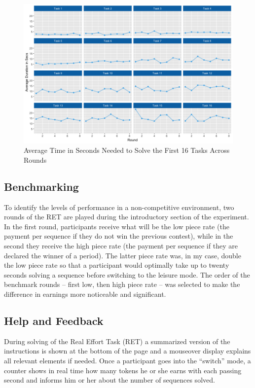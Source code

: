     \begin{figure}[h]
        \centering
        \includegraphics[width = \textwidth]{graphs/avg_time_per_task_round.png}
        \caption{Average Time in Seconds Needed to Solve the First 16 Tasks Across Rounds}
        \label{fig:avg_time_task}
    \end{figure}
    
    
    \subsection{Benchmarking}
    \label{ss:benchmarking}
    
    To identify the levels of performance in a non-competitive environment, two rounds of the RET are played during the introductory section of the experiment. In the first round, participants receive what will be the low piece rate (the payment per sequence if they do not win the previous contest), while in the second they receive the high piece rate (the payment per sequence if they are declared the winner of a period). The latter piece rate was, in my case, double the low piece rate so that a participant would optimally take up to twenty seconds solving a sequence before switching to the leisure mode. The order of the benchmark rounds -- first low, then high piece rate -- was selected to make the difference in earnings more noticeable and significant.
    
    \subsection{Help and Feedback}
    
    During solving of the Real Effort Task (RET) a summarized version of the instructions is shown at the bottom of the page and a mouseover display explains all relevant elements if needed. Once a participant goes into the ``switch'' mode, a counter shows in real time how many tokens he or she earns with each passing second and informs him or her about the number of sequences solved.\\
    
